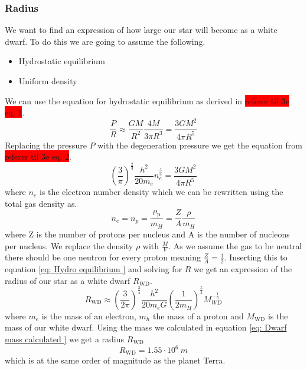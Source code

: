 \documentclass[reprint,english,notitlepage]{revtex4-2}
\begin{document}
\subsubsection*{Radius}
We want to find an expression of how large our star will become as a white dwarf. To do this we are going to assume the following. 
\begin{itemize}
  \item Hydrostatic equilibrium
  \item Uniform density
\end{itemize}

We can use the equation for hydrostatic equilibrium as derived in \colorbox{red}{referer til 3e eq, 1}. 
\begin{equation}\label{eq: Hydro equilibrium }
  \frac{P}{R} ≈  \frac{GM}{R^{2}} \frac{4M}{3 π R^{3}} = \frac{3GM^{2}}{4 π R^{5}}
\end{equation}
Replacing the pressure $ P $ with the degeneration pressure we get the equation from \colorbox{red}{referer til 3e eq, 2}. 
\begin{equation}\label{}
  \left( \frac{3}{π} \right) ^{\frac{2}{3}} \frac{h^{2}}{20m_e} n_{e}^{\frac{5}{3}} = \frac{3GM^{2}}{4 π R^{5}}
\end{equation}
where $ n_e $ is the electron number density which we can be rewritten using the total gas density as. 
\[
n_e = n_p = \frac{ρ_{\text{p}}}{m_{H}} = \frac{Z}{A} \frac{ρ}{m_{H}}
\]
where Z is the number of protons per nucleus and A is the number of nucleons per nucleus. We replace the density $ ρ $ with $ \frac{M}{V} $. As we assume the gas to be neutral there should be one neutron for every proton meaning $ \frac{Z}{A} = \frac{1}{2} $. Inserting this to equation \ref{eq: Hydro equilibrium } and solving for $ R $ we get an expression of the radius of our star as a white dwarf $ R_{\text{WD}} $. 
\begin{equation}\label{eq: Dwarf radius}
  R_{\text{WD}} ≈ \left( \frac{3}{2 π} \right) ^{\frac{3}{4}} \frac{h^{2}}{20 m_e G} \left( \frac{1}{2m_{H}} \right) ^{\frac{5}{3}} M_{WD} ^{-\frac{1}{3}}
\end{equation}
where $ m_e $ is the mass of an electron, $ m_h $ the mass of a proton and $ M_{\text{WD}} $ is the mass of our white dwarf. Using the mass we calculated in equation \ref{eq: Dwarf mass calculated } we get a radius $ R_{\text{WD}} $ 
\begin{equation}\label{eq: Darf radius calculated}
  R_{\text{WD}} = 1.55 ⋅ 10^{6}\ m 
\end{equation}
which is at the same order of magnitude as the planet Terra. 
\end{document}
